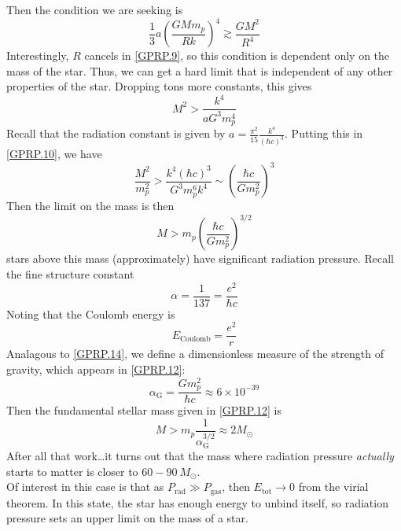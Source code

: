 \documentclass[10pt]{article}
\numberwithin{equation}{section}
\newcommand{\n}{\noindent}
\begin{document}
		Then the condition we are seeking is
		\begin{equation}
			\label{GPRP.9} \frac{1}{3}a\left(\frac{GMm_p}{Rk}\right)
^4\gtrsim\frac{GM^2}{R^4}
		\end{equation}
		Interestingly, $R$ cancels in \eqref{GPRP.9}, so this condition is 
dependent only on the mass of the star. Thus, we can get a hard limit that 
is independent of any other properties of the star. Dropping tons more 
constants, this gives
		\begin{equation}
			\label{GPRP.10} M^2>\frac{k^4}{a G^3m_p^4}
		\end{equation}
		Recall that the radiation constant is given by $a=\frac{\pi^2}
{15}\frac{k^4}{(\hbar c)^3}$. Putting this in \eqref{GPRP.10}, we have
		\begin{equation}
			\label{GPRP.11} \frac{M^2}{m_p^2}>\frac{k^4(\hbar c)^3}
{G^3m_p^6 k^4}\sim\left(\frac{\hbar c}{G m_p^2}\right)^3
		\end{equation}
		Then the limit on the mass is then
		\begin{equation}
			\label{GPRP.12}\boxed{ M>m_p\left(\frac{\hbar c}{Gm_p^2}\right)
^{3/2}}
		\end{equation}
		stars above this mass (approximately) have significant radiation 
pressure. Recall the fine structure constant
		\begin{equation}
			\label{GPRP.13} \alpha=\frac{1}{137} =\frac{e^2}{\hbar c}
		\end{equation}
		Noting that the Coulomb energy is
		\begin{equation}
			\label{GPRP.14} E_{\mathrm{Coulomb}}=\frac{e^2}{r}
		\end{equation}
		Analagous to \eqref{GPRP.14}, we define a
                dimensionless measure of the strength of gravity,
                which appears in \eqref{GPRP.12}:
		\begin{equation}
			\label{GPRP.15} \alpha_\mathrm{G}=\frac{Gm_p^2}{\hbar c}\approx 
6\times 10^{-39}
		\end{equation}
		Then the fundamental stellar mass given in \eqref{GPRP.12} is
		\begin{equation}
			\label{GPRP.16} M>m_p\frac{1}{\alpha_{\mathrm{G}}^{3/2}}\approx 
2M_\odot
		\end{equation}
		After all that work\ldots it turns out that the mass where 
radiation pressure \emph{actually} starts to matter is closer to $60-90\ M_
\odot$.\\
		
		\n Of interest in this case is that as $P_{\mathrm{rad}}\gg P_
{\mathrm{gas}}$, then $E_{\mathrm{tot}}\to 0$ from the virial theorem. In 
this state, the star has enough energy to unbind itself, so radiation 
pressure sets an upper limit on the mass of a star.
\end{document}
